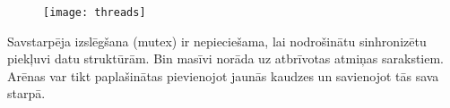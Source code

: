 \begin{figure}[h]
\begin{center}
\texttt{[image: threads]}
\end{center}
\caption{\textbf{\fontsize{11}{12}\selectfont {Arēnas un pavedieni }}}
\label{fig:alloc}
\end{figure}

 Savstarpēja izslēgšana (mutex) ir nepieciešama, lai nodrošinātu sinhronizētu piekļuvi datu struktūrām. 
 Bin masīvi norāda uz atbrīvotas atmiņas sarakstiem.
 Arēnas var tikt paplašinātas pievienojot jaunās kaudzes un savienojot tās sava starpā.


